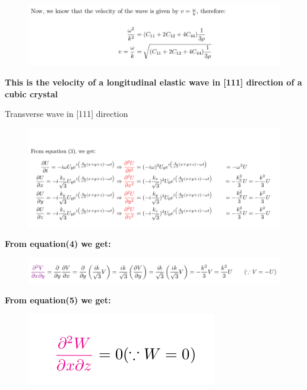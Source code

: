 \documentclass[aspectratio=43]{beamer}
\begin{document}
 \begin{frame}
       \begin{figure}
        \centering
        \includegraphics[width=\linewidth]{images/9.png}
    \end{figure}
    \textbf{This is the velocity of a longitudinal elastic wave in [111] direction of a cubic crystal}
\end{frame}





 \begin{frame}{Transverse wave in [111] direction}
       \begin{figure}
        \centering
        \includegraphics[width=\linewidth]{images/6.png}
    \end{figure}
\end{frame}


 \begin{frame}
 \textbf{From equation(4) we get:}
       \begin{figure}
        \centering
        \includegraphics[width=\linewidth]{images/10.png}
    \end{figure}
    \textbf{From equation(5) we get:}
    \begin{figure}
        \centering
        \includegraphics[width=0.3\linewidth]{images/11.png}
    \end{figure}
\end{frame}
\end{document}
